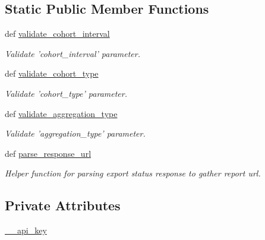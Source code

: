 \subsection*{Static Public Member Functions}
\begin{DoxyCompactItemize}
\item 
def \hyperlink{classtune_1_1management_1_1reports_1_1reports__insights__base_1_1ReportsInsightBase_ad46443a32fbdae1590e4dfbeb945c566}{validate\-\_\-cohort\-\_\-interval}
\begin{DoxyCompactList}\small\item\em Validate 'cohort\-\_\-interval' parameter. \end{DoxyCompactList}\item 
def \hyperlink{classtune_1_1management_1_1reports_1_1reports__insights__base_1_1ReportsInsightBase_a78f6a5bfe7258d65e381281510ae9909}{validate\-\_\-cohort\-\_\-type}
\begin{DoxyCompactList}\small\item\em Validate 'cohort\-\_\-type' parameter. \end{DoxyCompactList}\item 
def \hyperlink{classtune_1_1management_1_1reports_1_1reports__insights__base_1_1ReportsInsightBase_a21b9eb499a7eb17b2a9bb887d4490688}{validate\-\_\-aggregation\-\_\-type}
\begin{DoxyCompactList}\small\item\em Validate 'aggregation\-\_\-type' parameter. \end{DoxyCompactList}\item 
def \hyperlink{classtune_1_1management_1_1reports_1_1reports__insights__base_1_1ReportsInsightBase_ac71e815c7e9b4f3183b81d221589cbfb}{parse\-\_\-response\-\_\-url}
\begin{DoxyCompactList}\small\item\em Helper function for parsing export status response to gather report url. \end{DoxyCompactList}\end{DoxyCompactItemize}
\subsection*{Private Attributes}
\begin{DoxyCompactItemize}
\item 
\hyperlink{classtune_1_1management_1_1reports_1_1reports__insights__base_1_1ReportsInsightBase_a0d22e330edc50e64ff0a26b6f6f6154a}{\-\_\-\-\_\-api\-\_\-key}
\end{DoxyCompactItemize}


